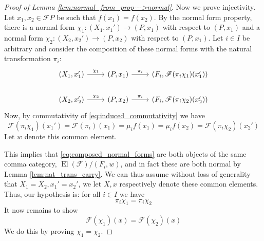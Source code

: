 \documentclass[12pt]{article}
\theoremstyle{plain}
\theoremstyle{definition}
\newcommand{\scr}[1]{\mathscr{#1}}
\newcommand{\lto}{\longrightarrow}
\begin{document}
\begin{proof}[Proof of Lemma \ref{lem:normal_from_prop--->normal}]
		Now we prove injectivity. Let $x_1,x_2 \in \scr{F}P$ be such that $f(x_1) = f(x_2)$. By the normal form property, there is a normal form $\chi_1: (X_1, x_1') \lto (P, x_1)$ with respect to $(P,x_1)$ and a normal form $\chi_2: (X_2, x_2') \lto (P, x_2)$ with respect to $(P,x_1)$. Let $i \in I$ be arbitrary and consider the composition of these normal forms with the natural transformation $\pi_i$:
		\begin{equation}\label{eq:composed_normal_forms}
			\begin{tikzcd}
				(X_1,x_1')\arrow[r,"{\chi_1}"] & (P, x_1)\arrow[r,"{\pi_i}"] & (F_i, \scr{F}(\pi_i \chi_1)(x_1'))\\
				(X_2,x_2')\arrow[r,"{\chi_2}"] & (P, x_2)\arrow[r,"{\pi_i}"] & (F_i, \scr{F}(\pi_i \chi_2)(x_2'))
				\end{tikzcd}
			\end{equation}
		Now, by commutativity of \eqref{eq:induced_commutativity} we have
		\begin{equation}
			\scr{F}(\pi_i \chi_1)(x_1') = \scr{F}(\pi_i)(x_1) = \mu_i f(x_1) = \mu_if(x_2) = \scr{F}(\pi_i \chi_2)(x_2')
			\end{equation}
		Let $w$ denote this common element.
		
		This implies that \eqref{eq:composed_normal_forms} are both objects of the same comma category, $\operatorname{El}(\scr{F})/(F_i, w)$, and in fact these are both normal by Lemma \ref{lem:nat_trans_carry}. We can thus assume without loss of generality that $X_1 = X_2, x_1' = x_2'$, we let $X,x$ respectively denote these common elements. Thus, our hypothesis is: for all $i \in I$ we have
		\begin{equation}\label{eq:epi_would_be_nice}
			\pi_i\chi_1 = \pi_i\chi_2
			\end{equation}
		It now remains to show 
		\begin{equation}
			\scr{F}(\chi_1)(x) = \scr{F}(\chi_2)(x)
			\end{equation}
		We do this by proving $\chi_1 = \chi_2$.
		

\end{proof}
\end{document}
